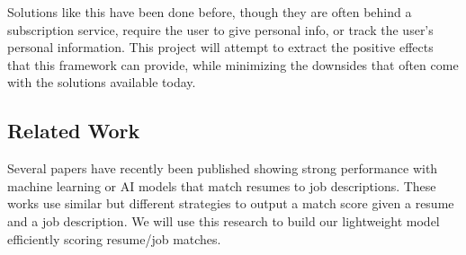 \documentclass[12pt]{article}
\begin{document}
Solutions like this have been done before, though they are often behind a subscription service, require the user to give personal info, or track the user's personal information. This project will attempt to extract the positive effects that this framework can provide, while minimizing the downsides that often come with the solutions available today.

\subsection{Related Work}

Several papers have recently been published showing strong performance with machine learning or AI models that match resumes to job descriptions. These works use similar but different strategies to output a match score given a resume and a job description. We will use this research to build our lightweight model efficiently scoring resume/job matches.
\end{document}
